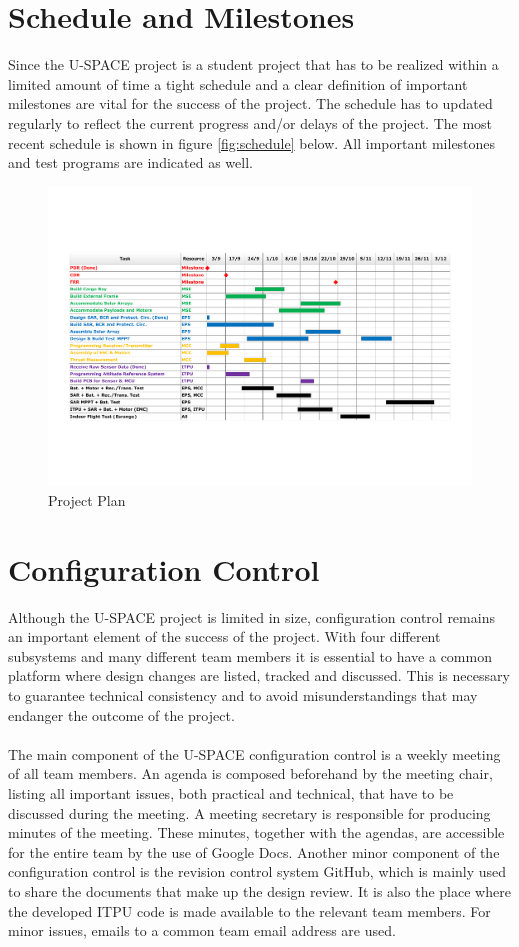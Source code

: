 \section{Schedule and Milestones}
%
Since the \ac{U-SPACE} project is a student project that has to be realized within a limited amount of time a tight schedule and a clear definition of important milestones are vital for the success of the project. The schedule has to updated regularly to reflect the current progress and/or delays of the project. The most recent schedule is shown in figure \ref{fig:schedule} below. All important milestones and test programs are indicated as well.
%
\begin{figure}
\centering
\includegraphics[width=\textwidth]{figures/fig_CDR_PM_GanttChart}
\caption{Project Plan}
\label{fig:project_plan}
\end{figure}
%
%
\section{Configuration Control}
%
Although the \ac{U-SPACE} project is limited in size, configuration control remains an important element of the success of the project. With four different subsystems and many different team members it is essential to have a common platform where design changes are listed, tracked and discussed. This is necessary to guarantee technical consistency and to avoid misunderstandings that may endanger the outcome of the project.
\\
\\
The main component of the \ac{U-SPACE} configuration control is a weekly meeting of all team members. An agenda is composed beforehand by the meeting chair, listing all important issues, both practical and technical, that have to be discussed during the meeting. A meeting secretary is responsible for producing minutes of the meeting. These minutes, together with the agendas, are accessible for the entire team by the use of Google Docs. Another minor component of the configuration control is the revision control system GitHub, which is mainly used to share the documents that make up the design review. It is also the place where the developed \ac{ITPU} code is made available to the relevant team members. For minor issues, emails to a common team email address are used.
%
